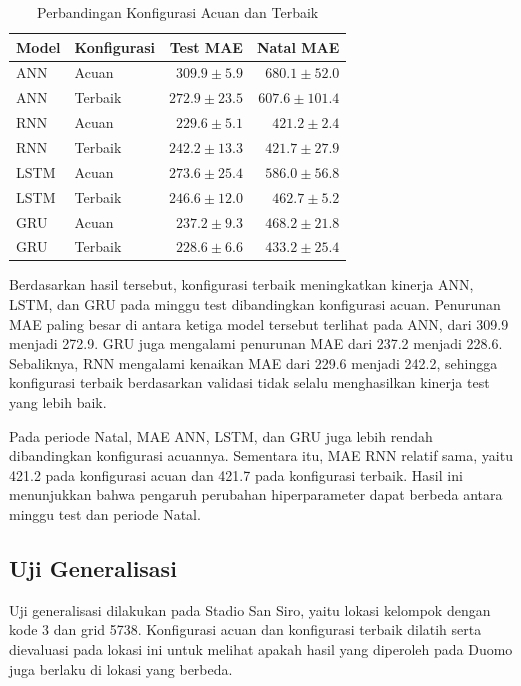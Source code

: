 \documentclass[conference,a4paper]{IEEEtran}
\begin{document}
\begin{table}[!t]
    \centering
    \caption{Perbandingan Konfigurasi Acuan dan Terbaik}
    \label{tab:hasil-terbaik}
    \footnotesize
    \begin{tabular}{llrr}
        \toprule
        Model & Konfigurasi & Test MAE & Natal MAE \\
        \midrule
        ANN & Acuan
        & $309.9 \pm 5.9$ & $680.1 \pm 52.0$ \\
        ANN & Terbaik
        & $272.9 \pm 23.5$ & $607.6 \pm 101.4$ \\
        \midrule
        RNN & Acuan
        & $229.6 \pm 5.1$ & $421.2 \pm 2.4$ \\
        RNN & Terbaik
        & $242.2 \pm 13.3$ & $421.7 \pm 27.9$ \\
        \midrule
        LSTM & Acuan
        & $273.6 \pm 25.4$ & $586.0 \pm 56.8$ \\
        LSTM & Terbaik
        & $246.6 \pm 12.0$ & $462.7 \pm 5.2$ \\
        \midrule
        GRU & Acuan
        & $237.2 \pm 9.3$ & $468.2 \pm 21.8$ \\
        GRU & Terbaik
        & $228.6 \pm 6.6$ & $433.2 \pm 25.4$ \\
        \bottomrule
    \end{tabular}
\end{table}

Berdasarkan hasil tersebut, konfigurasi terbaik meningkatkan
kinerja ANN, LSTM, dan GRU pada minggu test dibandingkan
konfigurasi acuan. Penurunan MAE paling besar di antara
ketiga model tersebut terlihat pada ANN, dari 309.9 menjadi
272.9. GRU juga mengalami penurunan MAE dari 237.2 menjadi
228.6. Sebaliknya, RNN mengalami kenaikan MAE dari 229.6
menjadi 242.2, sehingga konfigurasi terbaik berdasarkan
validasi tidak selalu menghasilkan kinerja test yang lebih
baik.

Pada periode Natal, MAE ANN, LSTM, dan GRU juga lebih
rendah dibandingkan konfigurasi acuannya. Sementara itu,
MAE RNN relatif sama, yaitu 421.2 pada konfigurasi acuan
dan 421.7 pada konfigurasi terbaik. Hasil ini menunjukkan
bahwa pengaruh perubahan hiperparameter dapat berbeda
antara minggu test dan periode Natal.


\subsection{Uji Generalisasi}

Uji generalisasi dilakukan pada Stadio San Siro, yaitu
lokasi kelompok dengan kode 3 dan grid 5738. Konfigurasi
acuan dan konfigurasi terbaik dilatih serta dievaluasi pada
lokasi ini untuk melihat apakah hasil yang diperoleh pada
Duomo juga berlaku di lokasi yang berbeda.
\end{document}
